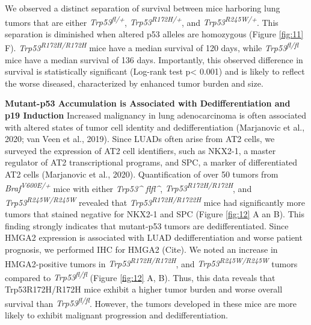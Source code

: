 We observed a distinct separation of survival between mice harboring lung tumors that are either \emph{Trp53\textsuperscript{fl/+}}, \emph{Trp53\textsuperscript{R172H/+}}, and \emph{Trp53\textsuperscript{R245W/+}}. This separation is diminished when altered p53 alleles are homozygous (Figure \ref{fig:11} F). \emph{Trp53\textsuperscript{R172H/R172H}} mice have a median survival of 120 days, while \emph{Trp53\textsuperscript{fl/fl}} mice have a median survival of 136 days. Importantly, this observed difference in survival is statistically significant (Log-rank test p\textless{} 0.001) and is likely to reflect the worse diseased, characterized by enhanced tumor burden and size.

\textbf{Mutant-p53 Accumulation is Associated with Dedifferentiation and p19 Induction}
Increased malignancy in lung adenocarcinoma is often associated with altered states of tumor cell identity and dedifferentiation (Marjanovic et al., 2020; van Veen et al., 2019). Since LUADs often arise from AT2 cells, we surveyed the expression of AT2 cell identifiers, such as NKX2-1, a master regulator of AT2 transcriptional programs, and SPC, a marker of differentiated AT2 cells (Marjanovic et al., 2020). Quantification of over 50 tumors from \emph{Braf\textsuperscript{V600E/+}} mice with either \emph{Trp53\^{} flfl\^{}}, \emph{Trp53\textsuperscript{R172H/R172H}}, and \emph{Trp53\textsuperscript{R245W/R245W}} revealed that \emph{Trp53\textsuperscript{R172H/R1722H}} mice had significantly more tumors that stained negative for NKX2-1 and SPC (Figure \ref{fig:12} A an B). This finding strongly indicates that mutant-p53 tumors are dedifferentiated. Since HMGA2 expression is associated with LUAD dedifferentiation and worse patient prognosis, we performed IHC for HMGA2 (Cite). We noted an increase in HMGA2-positive tumors in \emph{Trp53\textsuperscript{R172H/R172H}}, and \emph{Trp53\textsuperscript{R245W/R245W}} tumors compared to \emph{Trp53\textsuperscript{fl/fl}} (Figure \ref{fig:12} A, B). Thus, this data reveals that Trp53R172H/R172H mice exhibit a higher tumor burden and worse overall survival than \emph{Trp53\textsuperscript{fl/fl}}. However, the tumors developed in these mice are more likely to exhibit malignant progression and dedifferentiation.

